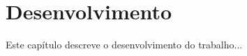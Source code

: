\chapter{Desenvolvimento}
\label{cap:desenvolvimento}

Este capítulo descreve o desenvolvimento do trabalho...
